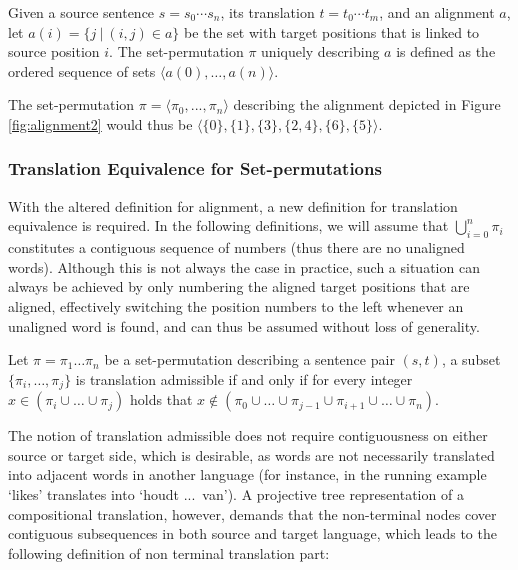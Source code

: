 \documentclass{report}
\begin{document}
\begin{definition}\label{def:sperm}
Given a source sentence $s = s_0 \cdots s_n$, its translation $t = t_0 \cdots t_m$, and an alignment $a$, let $a(i) = \{j~|~(i,j)\in a\}$ be the set with target positions that is linked to source position $i$. The set-permutation $\pi$ uniquely describing $a$ is defined as the ordered sequence of sets
$\langle a(0), \ldots, a(n) \rangle$.
\end{definition}

\noindent The set-permutation $\pi = \langle\pi_0, ..., \pi_n\rangle$ describing the alignment depicted in Figure \ref{fig:alignment2} would thus be $\langle \{0\}, \{1\}, \{3\}, \{2,4\}, \{6\}, \{5\}\rangle$. 

\subsubsection{Translation Equivalence for Set-permutations}

With the altered definition for alignment, a new definition for translation equivalence is required. In the following definitions, we will assume that $\bigcup_{i=0}^{n} \pi_i$ constitutes a contiguous sequence of numbers (thus there are no unaligned words). Although this is not always the case in practice, such a situation can always be achieved by only numbering the aligned target positions that are aligned, effectively switching the position numbers to the left whenever an unaligned word is found, and can thus be assumed without loss of generality.

\begin{definition}\label{def:transadd}
Let $\pi = \pi_1 \ldots \pi_n$ be a set-permutation describing a sentence pair $(s,t)$, a subset $\{\pi_i,\ldots,\pi_j\}$ is translation admissible if and only if for every integer $x \in (\pi_i\cup \ldots \cup\pi_j)$ holds that $x \notin (\pi_0\cup \ldots \cup \pi_{j-1} \cup \pi_{i+1}\cup\ldots\cup \pi_n)$.
\end{definition}

\noindent The notion of translation admissible does not require contiguousness on either source or target side, which is desirable, as words are not necessarily translated into adjacent words in another language (for instance, in the running example `likes' translates into `houdt ...~van'). A projective tree representation of a compositional translation, however, demands that the non-terminal nodes cover contiguous subsequences in both source and target language, which leads to the following definition of non terminal translation part:
\end{document}
